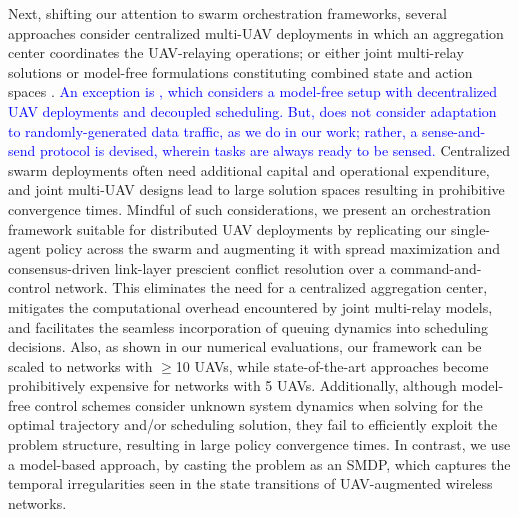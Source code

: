 \documentclass[12pt, draftcls, onecolumn]{IEEEtran}
\theoremstyle{plain}
\theoremstyle{definition}
\theoremstyle{remark}
\newcommand\hlt[1]{\textcolor{blue}{#1}}
\begin{document}
Next, shifting our attention to swarm orchestration frameworks, several approaches consider centralized multi-UAV deployments \cite{JointTrajectoryDesign, MultiDroneDeployment, CSCA-ADMM} in which an aggregation center coordinates the UAV-relaying operations; or either joint multi-relay solutions \cite{CSCA-ADMM, GameTheory, UAVDynamicCoverage} or model-free formulations constituting combined state and action spaces \cite{DDQN, MEC-DDPG, DQNPositioning, MLDeployment}. \hlt{An exception is \cite{RLSenseSend}, which considers a model-free setup with decentralized UAV deployments and decoupled scheduling. But, \cite{RLSenseSend} does not consider adaptation to randomly-generated data traffic, as we do in our work; rather, a sense-and-send protocol is devised, wherein tasks are always ready to be sensed.} Centralized swarm deployments often need additional capital and operational expenditure, and joint multi-UAV designs lead to large solution spaces resulting in prohibitive convergence times. Mindful of such considerations, we present an orchestration framework suitable for distributed UAV deployments by replicating our single-agent policy across the swarm and augmenting it with spread maximization and consensus-driven link-layer prescient conflict resolution over a command-and-control network. This eliminates the need for a centralized aggregation center, mitigates the computational overhead encountered by joint multi-relay models, and facilitates the seamless incorporation of queuing dynamics into scheduling decisions. Also, as shown in our numerical evaluations, our framework can be scaled to networks with $\geq$10 UAVs, while state-of-the-art approaches \cite{SCA, CSCA-ADMM, DDQN} become prohibitively expensive for networks with 5 UAVs. Additionally, although model-free control schemes \cite{DDQN, MEC-DDPG, RLSenseSend, DQNPositioning, MLDeployment, UAV-DRL} consider unknown system dynamics when solving for the optimal trajectory and/or scheduling solution, they fail to efficiently exploit the problem structure, resulting in large policy convergence times. In contrast, we use a model-based approach, by casting the problem as an SMDP, which captures the temporal irregularities seen in the state transitions of UAV-augmented wireless networks.
\end{document}
